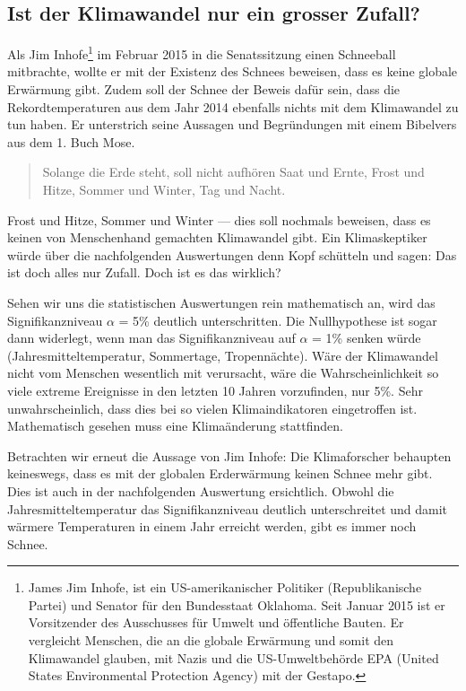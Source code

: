 \begin{refsection}
\section{Ist der Klimawandel nur ein grosser Zufall?}
Als Jim Inhofe\footnote{%
James \glqq Jim\grqq{} Inhofe, ist ein US-amerikanischer Politiker (Republikanische Partei) und Senator für den Bundesstaat Oklahoma. Seit Januar 2015 ist er Vorsitzender des Ausschusses für Umwelt und öffentliche Bauten. Er vergleicht Menschen, die an die globale Erwärmung und somit den Klimawandel glauben, mit Nazis und die US-Umweltbehörde EPA (United States Environmental Protection Agency) mit der Gestapo.} im Februar 2015 in die Senatssitzung einen Schneeball mitbrachte, wollte er mit der Existenz des Schnees beweisen, dass es keine globale Erwärmung gibt. Zudem soll der Schnee der Beweis dafür sein, dass die Rekordtemperaturen aus dem Jahr 2014 ebenfalls nichts mit dem Klimawandel zu tun haben. Er unterstrich seine Aussagen und Begründungen mit einem Bibelvers aus dem 1. Buch Mose.

\begin{quote} 
Solange die Erde steht, soll nicht aufhören Saat und Ernte, Frost und Hitze, Sommer und Winter, Tag und Nacht.
\end{quote}

Frost und Hitze, Sommer und Winter --- dies soll nochmals beweisen, dass es keinen von Menschenhand gemachten Klimawandel gibt.
Ein Klimaskeptiker würde über die nachfolgenden Auswertungen denn Kopf schütteln und sagen: Das ist doch alles nur Zufall. Doch ist es das wirklich?

Sehen wir uns die statistischen Auswertungen rein mathematisch an, wird das Signifikanzniveau $\alpha$ = 5\% deutlich unterschritten. Die Nullhypothese ist sogar dann widerlegt, wenn man das Signifikanzniveau auf $\alpha$ = 1\% senken würde (Jahresmitteltemperatur, Sommertage, Tropennächte). Wäre der Klimawandel nicht vom Menschen wesentlich mit verursacht, wäre die Wahrscheinlichkeit so viele extreme Ereignisse in den letzten 10 Jahren vorzufinden, nur 5\%. Sehr unwahrscheinlich, dass dies bei so vielen Klimaindikatoren eingetroffen ist. Mathematisch gesehen muss eine Klimaänderung stattfinden.

Betrachten wir erneut die Aussage von Jim Inhofe: Die Klimaforscher behaupten keineswegs, dass es mit der globalen Erderwärmung keinen Schnee mehr gibt. Dies ist auch in der nachfolgenden Auswertung ersichtlich. Obwohl die Jahresmitteltemperatur das Signifikanzniveau deutlich unterschreitet und damit wärmere Temperaturen in einem Jahr erreicht werden, gibt es immer noch Schnee. 


\end{refsection}
